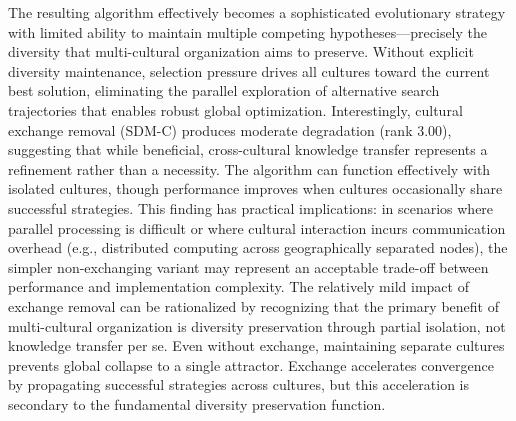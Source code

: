 \documentclass[11pt]{article}
\begin{document}
The resulting algorithm effectively becomes a sophisticated evolutionary strategy with limited ability to maintain multiple competing hypotheses—precisely the diversity that multi-cultural organization aims to preserve. Without explicit diversity maintenance, selection pressure drives all cultures toward the current best solution, eliminating the parallel exploration of alternative search trajectories that enables robust global optimization.
Interestingly, cultural exchange removal (SDM-C) produces moderate degradation (rank 3.00), suggesting that while beneficial, cross-cultural knowledge transfer represents a refinement rather than a necessity. The algorithm can function effectively with isolated cultures, though performance improves when cultures occasionally share successful strategies. This finding has practical implications: in scenarios where parallel processing is difficult or where cultural interaction incurs communication overhead (e.g., distributed computing across geographically separated nodes), the simpler non-exchanging variant may represent an acceptable trade-off between performance and implementation complexity.
The relatively mild impact of exchange removal can be rationalized by recognizing that the primary benefit of multi-cultural organization is diversity preservation through partial isolation, not knowledge transfer per se. Even without exchange, maintaining separate cultures prevents global collapse to a single attractor. Exchange accelerates convergence by propagating successful strategies across cultures, but this acceleration is secondary to the fundamental diversity preservation function.
\end{document}
